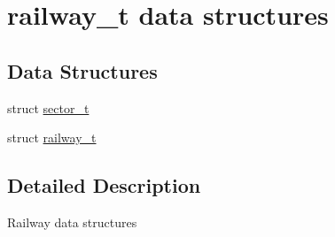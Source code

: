\hypertarget{group__railway__t__structs}{\section{railway\-\_\-t data structures}
\label{group__railway__t__structs}
}
\subsection*{Data Structures}
\begin{DoxyCompactItemize}
\item 
struct \hyperlink{structsector__t}{sector\-\_\-t}
\item 
struct \hyperlink{structrailway__t}{railway\-\_\-t}
\end{DoxyCompactItemize}


\subsection{Detailed Description}
Railway data structures 